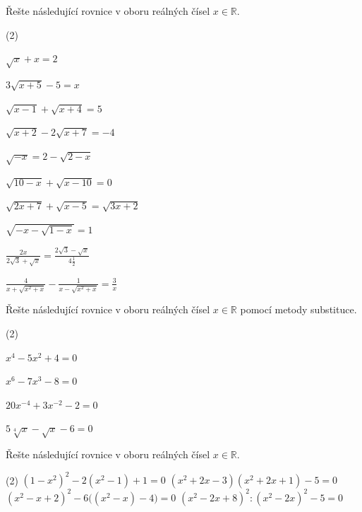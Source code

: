 \documentclass[12pt,a4paper]{article}
\begin{document}
\begin{exercise}
Řešte následující rovnice v oboru reálných čísel \(x \in \mathbb{R}\).

\begin{tasks}(2)

  \task \(\sqrt{x} + x = 2\)

  \task \(3\sqrt{x+5} - 5 = x\)

  \task \(\sqrt{x-1} + \sqrt{x+4} = 5\)

  \task \(\sqrt{x+2} - 2\sqrt{x+7} = -4\)

  \task \(\sqrt{-x} = 2 - \sqrt{2 - x}\)

  \task \(\sqrt{10 - x} + \sqrt{x - 10} = 0\)

  \task \(\sqrt{2x + 7} + \sqrt{x - 5} = \sqrt{3x + 2}\)

  \task \(\sqrt{-x - \sqrt{1 - x}} = 1\)

  \task $
  \frac{2x}{2\sqrt{3} + \sqrt{x}} = 
  \frac{2\sqrt{3} - \sqrt{x}}{4 \frac{1}{2}}
  $

  \task 
  $
  \frac{4}{x + \sqrt{x^2 + x}} 
  - 
  \frac{1}{x - \sqrt{x^2 + x}} 
  = 
  \frac{3}{x}
  $

\end{tasks}

\end{exercise}


\begin{exercise}
Řešte následující rovnice v oboru reálných čísel \(x \in \mathbb{R}\) pomocí metody substituce.

\begin{tasks}(2)

  \task \(x^4 - 5x^2 + 4 = 0\)

  \task \(x^6 - 7x^3 - 8 = 0\)

  \task \(20x^{-4} + 3x^{-2} - 2 = 0\)

  \task \(5\sqrt[4]{x} - \sqrt{x} - 6 = 0\)

\end{tasks}

\end{exercise}


\begin{exercise}
Řešte následující rovnice v oboru reálných čísel \(x \in \mathbb{R}\).

\begin{tasks}(2)
  \task $ (1 - x^2)^2 - 2(x^2 - 1) + 1 = 0$
  \task $(x^2 + 2x - 3)(x^2 + 2x + 1) - 5 = 0$
  \task $(x^2 - x + 2)^2 - 6\bigl((x^2 - x) - 4\bigr) = 0$
  \task $(x^2 - 2x + 8)^2 : (x^2 - 2x)^2 - 5 = 0$
\end{tasks}

\end{exercise}
\end{document}
